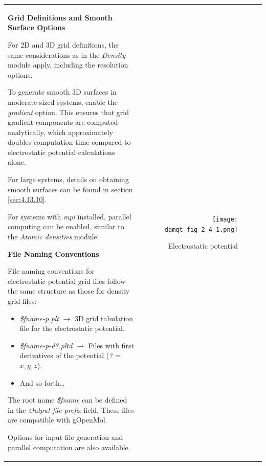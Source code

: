 \documentclass[10pt]{article}
\begin{document}
\begin{tabular}{lr}
\hspace*{-3mm}
\begin{minipage}{.6\linewidth}


\vspace*{3mm}
{\bf Grid Definitions and Smooth Surface Options}
\vspace*{3mm}

For 2D and 3D grid definitions, the same considerations as in the {\it Density} module apply,
including the resolution options.

To generate smooth 3D surfaces in moderate-sized systems,
enable the {\it gradient}\index{electrostatic potential!gradient} option.
This ensures that grid gradient components are computed analytically,
which approximately doubles computation time compared to electrostatic potential calculations alone.

For large systems, details on obtaining smooth surfaces can be found in section \ref{sec:4.13.10}\index{smooth surfaces}.

For systems with {\it mpi} installed, parallel computing can be enabled,
similar to the {\it Atomic densities} module.

\vspace*{3mm}
{\bf File Naming Conventions}
\vspace*{3mm}

File naming conventions for electrostatic potential grid files\index{electrostatic potential!grid}
follow the same structure as those for density grid files:

\begin{itemize}
\item {\it \$fname-p.plt} $\rightarrow$ 3D grid tabulation file for the electrostatic potential.
\item {\it \$fname-p-d?.pltd} $\rightarrow$ Files with first derivatives of the potential ({\it ?} = $x, y, z$).
\item And so forth…
\end{itemize}

The root name {\it \$fname} can be defined in the {\it Output file prefix} field.
These files are compatible with gOpenMol.

Options for input file generation and parallel computation are also available.

\end{minipage}
&
\begin{minipage}{.4\linewidth}

\begin{figure}[H]
\begin{center}
\vspace*{-5mm}
\texttt{[image: damqt\_fig\_2\_4\_1.png]}
\end{center}
\caption{Electrostatic potential \label{fig:2_4_1}}
\end{figure}
\end{minipage}
\end{tabular}
\vspace*{0.1mm}
\end{document}
